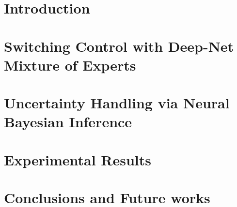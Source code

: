\documentclass[12pt,twoside]{report}
\begin{document}

\cleardoublepage
\begintext


\chapter{Introduction}

\chapter{Switching Control with Deep-Net Mixture of Experts}




\chapter{Uncertainty Handling via Neural Bayesian Inference}




\chapter{Experimental Results}


\chapter{Conclusions and Future works}

{} 




\end{document}
